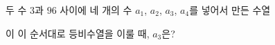 두 수 $3$과 $96$ 사이에 네 개의 수 $a_1$, $a_2$, $a_3$, $a_4$를 넣어서 만든 수열\par\smallskip{}\par\smallskip\noindent 이 이 순서대로 등비수열을 이룰 때, $a_3$은?

